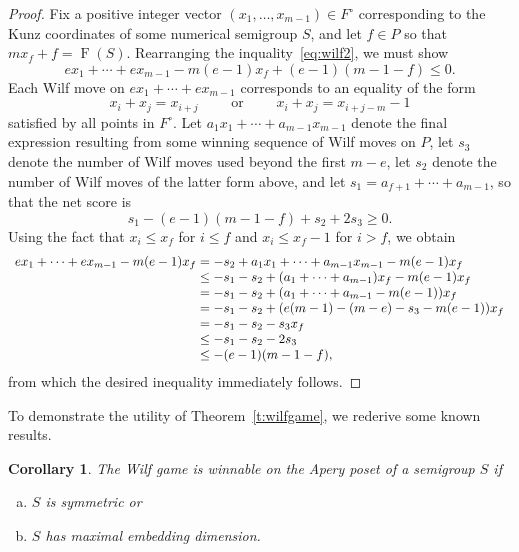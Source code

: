 \documentclass[12pt]{amsart}
\newtheorem{cor}[thm]{Corollary}
\theoremstyle{definition}
\numberwithin{equation}{section}
\renewcommand\>{\rangle}
\newcommand\<{\langle}
\newcommand\0{\mathbf{0}}
\begin{document}
\begin{proof}
Fix a positive integer vector $(x_1, \ldots, x_{m-1}) \in F^\circ$ corresponding to the Kunz coordinates of some numerical semigroup $S$, and let $f \in P$ so that $mx_f + f = \operatorname{F}(S)$.  Rearranging the inquality~\eqref{eq:wilf2}, we must show 
$$ex_1 + \cdots + ex_{m-1} - m(e - 1)x_f + (e - 1)(m - 1 - f) \le 0.$$
Each Wilf move on $ex_1 + \cdots + ex_{m-1}$ corresponds to an equality of the form 
$$x_i + x_j = x_{i+j} \qquad \text{ or } \qquad x_i + x_j = x_{i+j-m} - 1$$
satisfied by all points in $F^\circ$.  Let $a_1x_1 + \cdots + a_{m-1}x_{m-1}$ denote the final expression resulting from some winning sequence of Wilf moves on $P$, let $s_3$ denote the number of Wilf moves used beyond the first $m - e$, let $s_2$ denote the number of Wilf moves of the latter form above, and let $s_1 = a_{f+1} + \cdots + a_{m-1}$, so that the net score is 
$$s_1 - (e-1)(m - 1 - f) + s_2 + 2s_3 \ge 0.$$
Using the fact that $x_i \le x_f$ for $i \le f$ and $x_i \le x_f - 1$ for $i > f$, we obtain
$$\begin{array}{r@{}c@{}l}
ex_1 + \cdots + ex_{m-1} - m(e - 1)x_f &{}={}&  -s_2 + a_1x_1 + \cdots + a_{m-1}x_{m-1} - m(e - 1)x_f \\
&{}\le{}& -s_1 - s_2 + (a_1 + \cdots + a_{m-1})x_f - m(e - 1)x_f \\
&{}={}& -s_1 - s_2 + (a_1 + \cdots + a_{m-1} - m(e-1))x_f \\
&{}={}& -s_1 - s_2 + (e(m - 1) - (m - e) - s_3 - m(e - 1))x_f \\
&{}={}& -s_1 - s_2 - s_3x_f \\
&{}\le{}& -s_1 - s_2 - 2s_3 \\
&{}\le{}& -(e - 1)(m - 1 - f),
\end{array}$$
from which the desired inequality immediately follows.  
\end{proof}

To demonstrate the utility of Theorem~\ref{t:wilfgame}, we rederive some known results.  

\begin{cor}\label{c:wilfgame}
The Wilf game is winnable on the Apery poset of a semigroup $S$ if
\begin{enumerate}[(a)]
\item 
$S$ is symmetric or

\item 
$S$ has maximal embedding dimension.  
\end{enumerate}
\end{cor}
\end{document}
